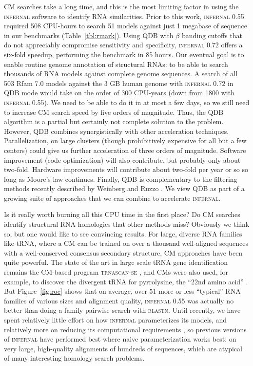 \documentclass[11pt]{article}
\begin{document}
CM searches take a long time, and this is the most limiting factor in
using the \textsc{infernal} software to identify RNA similarities.
Prior to this work, \textsc{infernal} 0.55 required 508 CPU-hours to
search 51 models against just 1 megabase of sequence in our benchmarks
(Table~\ref{tbl:rmark}).  Using QDB with $\beta$ banding cutoffs that
do not appreciably compromise sensitivity and specificity,
\textsc{infernal} 0.72 offers a six-fold speedup, performing the
benchmark in 85 hours.  Our eventual goal is to enable routine genome
annotation of structural RNAs: to be able to search thousands of RNA
models against complete genome sequences.  A search of all 503 Rfam
7.0 models against the 3 GB human genome with \textsc{infernal} 0.72
in QDB mode would take on the order of 300 CPU-years (down from 1800
with \textsc{infernal} 0.55).  We need to be able to do it in at most
a few days, so we still need to increase CM search speed by five
orders of magnitude.  Thus, the QDB algorithm is a partial but
certainly not complete solution to the problem. However, QDB combines
synergistically with other acceleration techniques. Parallelization,
on large clusters (though prohibitively expensive for all but a few
centers) could give us further acceleration of three orders of
magnitude.  Software improvement (code optimization) will also
contribute, but probably only about two-fold.  Hardware improvements
will contribute about two-fold per year or so so long as Moore's law
continues. Finally, QDB is complementary to the filtering methods
recently described by Weinberg and Ruzzo
\cite{WeinbergRuzzo04,WeinbergRuzzo04b,WeinbergRuzzo06}. We view QDB
as part of a growing suite of approaches that we can combine to
accelerate \textsc{infernal}.

Is it really worth burning all this CPU time in the first place?  Do
CM searches identify structural RNA homologies that other methods
miss? Obviously we think so, but one would like to see convincing
results. For large, diverse RNA families like tRNA, where a CM can be
trained on over a thousand well-aligned sequences with a
well-conserved consensus secondary structure, CM approaches have been
quite powerful. The state of the art in large scale tRNA gene
identification remains the CM-based program \textsc{trnascan-se}
\cite{LoweEddy97}, and CMs were also used, for example, to discover
the divergent tRNA for pyrrolysine, the ``22nd amino acid''
\cite{Srinivasan02}. But Figure~\ref{fig:roc} shows that on average,
over 51 more or less ``typical'' RNA families of various sizes and
alignment quality, \textsc{infernal} 0.55 was actually no better than
doing a family-pairwise-search with \textsc{blastn}.  Until recently,
we have spent relatively little effort on how \textsc{infernal}
parameterizes its models, and relatively more on reducing its
computational requirements \cite{Eddy02b}, so previous versions of
\textsc{infernal} have performed best where naive parameterization
works best: on very large, high-quality alignments of hundreds of
sequences, which are atypical of many interesting homology search
problems.
\end{document}
